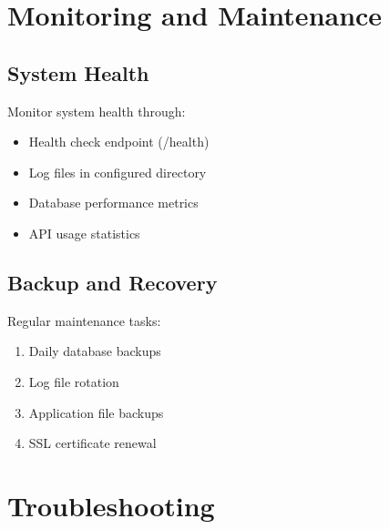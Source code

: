 \section{Monitoring and Maintenance}

\subsection{System Health}
Monitor system health through:
\begin{itemize}
    \item Health check endpoint (/health)
    \item Log files in configured directory
    \item Database performance metrics
    \item API usage statistics
\end{itemize}

\subsection{Backup and Recovery}
Regular maintenance tasks:
\begin{enumerate}
    \item Daily database backups
    \item Log file rotation
    \item Application file backups
    \item SSL certificate renewal
\end{enumerate}

\section{Troubleshooting}

